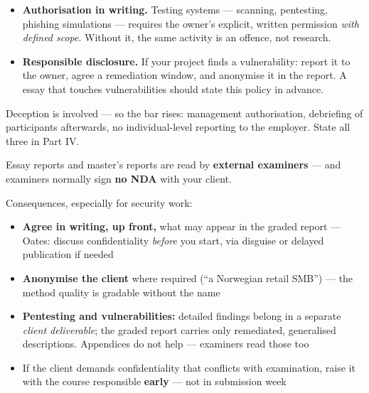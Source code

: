 \documentclass[11pt,a4paper,british,twoside=false,headings=small,chapterprefix=false,numbers=noenddot]{scrbook}
\newenvironment{block}[1]{\begin{tcolorbox}[scriptbox, title={#1}]}{\end{tcolorbox}}
\newenvironment{alertblock}[1]{\begin{tcolorbox}[scriptbox, colframe=uiared, colback=uiamutedred, title={#1}]}{\end{tcolorbox}}
\begin{document}
\begin{center}\small
\begin{itemize}\setlength{\itemsep}{0.5em}
    \item \textbf{Authorisation in writing.} Testing systems --- scanning,
          pentesting, phishing simulations --- requires the owner's explicit,
          written permission \emph{with defined scope}. Without it, the same
          activity is an offence, not research.
    \item \textbf{Responsible disclosure.} If your project finds a
          vulnerability: report it to the owner, agree a remediation window,
          and anonymise it in the report. A essay that touches
          vulnerabilities should state this policy in advance.
  \end{itemize}
  
  \begin{block}{Phishing simulations with employees}
    Deception is involved --- so the bar rises: management authorisation,
    debriefing of participants afterwards, no individual-level reporting to
    the employer. State all three in Part IV.
  \end{block}
\end{center}

\begin{center}\small
\begin{alertblock}{The fact that changes your planning}
    Essay reports and master's reports are read by \textbf{external examiners}
    --- and examiners normally sign \textbf{no NDA} with your client.
  \end{alertblock}
  
  \small Consequences, especially for security work:
  \begin{itemize}\setlength{\itemsep}{0.35em}
    \item \textbf{Agree in writing, up front,} what may appear in the graded
          report --- Oates: discuss confidentiality \emph{before} you start,
          via disguise or delayed publication if needed
    \item \textbf{Anonymise the client} where required (``a Norwegian retail
          SMB'') --- the method quality is gradable without the name
    \item \textbf{Pentesting and vulnerabilities:} detailed findings belong
          in a separate \emph{client deliverable}; the graded report carries
          only remediated, generalised descriptions. Appendices do not help
          --- examiners read those too
    \item If the client demands confidentiality that conflicts with
          examination, raise it with the course responsible \textbf{early}
          --- not in submission week
  \end{itemize}
\end{center}
\end{document}

